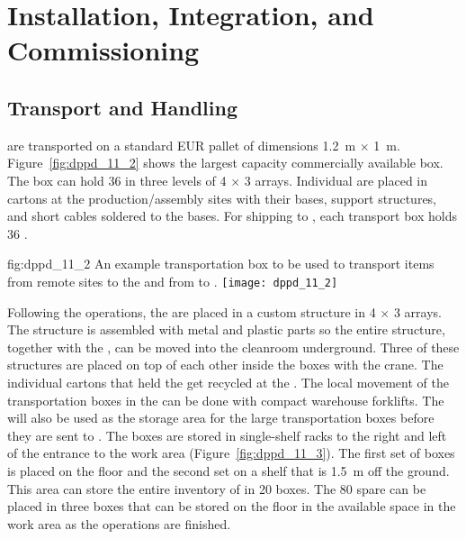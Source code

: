 \section{Installation, Integration, and Commissioning}
\label{sec:dp-pds-installation}

\subsection{Transport and Handling}

 are transported on a standard EUR pallet of dimensions \SI{1.2}{\m} $\times$ \SI{1}{\m}. Figure~\ref{fig:dppd_11_2} shows the largest capacity commercially available box. The box can hold \num{36}  in three levels of \num{4} $\times$ \num{3} arrays. Individual  are placed in cartons at the production/assembly sites with their bases, support structures, and short  cables soldered to the bases. For shipping to , each transport box holds \num{36} . %

\begin{dunefigure}{fig:dppd_11_2}
{An example transportation box to be used to transport items from remote sites to the  and from  to \surf.}
\texttt{[image: dppd\_11\_2]}
\end{dunefigure}

Following the  operations, the  are placed in a custom structure in \num{4} $\times$ \num{3} arrays. The structure is assembled with metal and plastic parts so the entire structure, together with the , can be moved into the cleanroom underground. Three of these structures are placed on top of each other inside the boxes with the crane. The individual cartons that held the  get recycled at the . The local movement of the transportation boxes in the  can be done with compact warehouse forklifts. The  will also be used as the storage area for the large  transportation boxes before they are sent to . The boxes are stored in single-shelf racks to the right and left of the entrance to the work area (Figure~\ref{fig:dppd_11_3}). The first set of boxes is placed on the floor and the second set on a shelf that is \SI{1.5}{\m} off the ground. This area can store the entire \dual {}  inventory of \dpnumpmtch {} in \num{20} boxes. The \num{80} spare  can be placed in three boxes that can be stored on the floor in the available space in the work area as the \dual {}  operations are finished.

